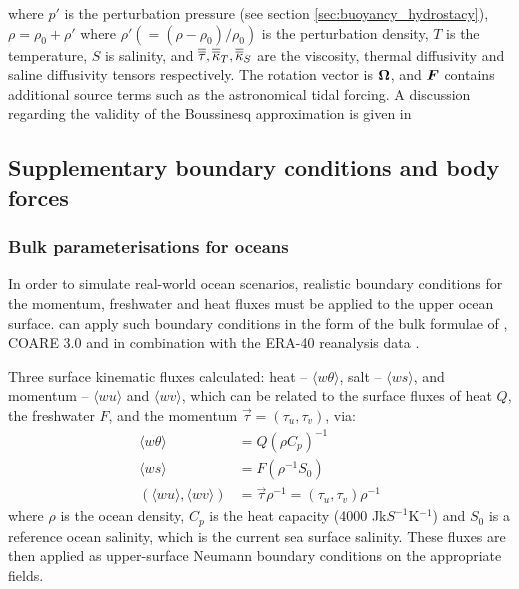 where $p'$ is the perturbation pressure (see section \ref{sec:buoyancy_hydrostacy}),
$\rho=\rho_0+\rho'$ where $\rho'(=(\rho-\rho_0)/\rho_0)$ is the perturbation density,
$T$ is the temperature, $S$ is salinity, and
$\overline{\overline{\tau}},\overline{\overline{\kappa}}_T,\overline{\overline{\kappa}}_S$ are the viscosity, thermal diffusivity and saline
diffusivity tensors respectively.
The rotation vector is ${\mbox{\boldmath$\Omega$}}$, and ${\mbox{\boldmath$F$}}$ contains additional source terms such as the astronomical tidal forcing. A discussion
regarding the validity of the Boussinesq approximation is given in \cite{Gray1976}

\subsection{Supplementary boundary conditions and body forces}

\subsubsection{Bulk parameterisations for oceans}

In order to simulate real-world ocean scenarios, realistic boundary conditions for the momentum, freshwater and heat fluxes 
must be applied to the upper ocean surface. \fluidity can apply such boundary conditions in the form of the bulk formulae of \citet{large2004},
COARE 3.0 \citep{fairall2003} and \citet{kara2005} in combination with the ERA-40 reanalysis data \citep{Uppala2005}.

Three surface kinematic fluxes calculated: heat -- $\langle w\theta \rangle$,
salt -- $\langle ws \rangle$, and momentum -- $\langle wu \rangle$ and $\langle wv \rangle$,
which can be related to the surface fluxes of heat $Q$, the
freshwater $F$, and the momentum $\overrightarrow\tau=\left(\tau_u,\tau_v\right)$, via:
\begin{align}
\langle w\theta \rangle &= Q\left(\rho C_p \right)^{-1} \\
\langle ws \rangle &= F\left(\rho^{-1}S_0\right) \\
\left(\langle wu \rangle, \langle wv \rangle\right) &=
\overrightarrow{\tau}\rho^{-1} =
\left(\tau_u,\tau_v\right)\rho^{-1}
\end{align}
where $\rho$ is the ocean density, $C_p$ is the heat capacity (4000 Jk$S^{-1}$K$^{-1}$) 
and $S_0$ is a reference ocean salinity, which is the current sea surface salinity. 
These fluxes are then applied as upper-surface Neumann boundary conditions on
the appropriate fields.

